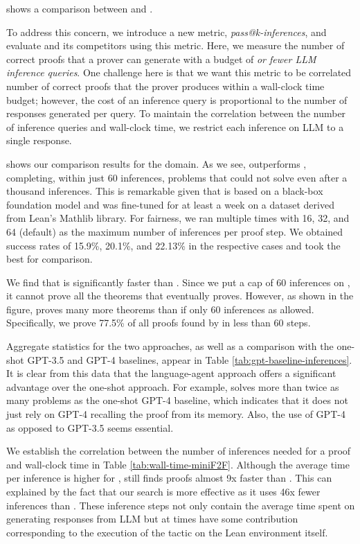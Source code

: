  shows a comparison between \copra and \proverbot.


To address this concern, we introduce a new metric, \emph{pass@k-inferences}, and 
evaluate \copra and its competitors using this metric. Here, we measure the number of correct proofs that a prover can generate with a budget of \emph{ or fewer LLM inference queries}. One challenge here is that we want this metric to be correlated number of correct proofs that the prover produces within a wall-clock time budget; however, the cost of an inference query is proportional to the number of responses generated per query. To maintain the correlation between 
the number of inference queries and wall-clock time, we restrict each inference on LLM to a single response. 


 shows our comparison results for the  domain.
As we see, \copra outperforms \reprover, completing, within just 60 inferences, problems that \reprover could not solve even after a thousand inferences. This is remarkable given that \copra is based on a black-box foundation model and \reprover was fine-tuned for at least a week on a dataset derived from Lean's Mathlib library. For fairness, we ran \reprover multiple times with 16, 32, and 64 (default) as the maximum number of inferences per proof step. We obtained success rates of 15.9\%, 20.1\%, and  22.13\% in the respective cases and took the best for comparison.


We find that \copra is significantly faster than \proverbot. Since we put a cap of 60 inferences on \copra, it cannot prove all the theorems that \proverbot eventually proves. However, as shown in the figure, \copra proves many more theorems than \proverbot if only 60 inferences as allowed. Specifically, we prove 77.5\% of all proofs found by \proverbot in less than 60 steps.

Aggregate statistics for the two approaches, as well as a comparison with the one-shot GPT-3.5 and GPT-4 baselines, appear in Table \ref{tab:gpt-baseline-inferences}. It is clear from this data that the language-agent approach offers a significant advantage over the one-shot approach. For example, \copra solves more than twice as many problems as the one-shot GPT-4 baseline, which indicates that it does not just rely on GPT-4 recalling the proof from its memory. Also, the use of GPT-4 as opposed to GPT-3.5 seems essential.


We establish the correlation between the number of inferences needed for a proof and wall-clock time in Table \ref{tab:wall-time-miniF2F}. 
Although the average time per inference is higher for \system, \copra still finds proofs almost 9x faster than \reprover. This can explained by the fact that our search is more effective as it uses 46x fewer inferences than \reprover. These inference steps not only contain the average time spent on generating responses from LLM but at times have some contribution corresponding to the execution of the tactic on the Lean environment itself. 



